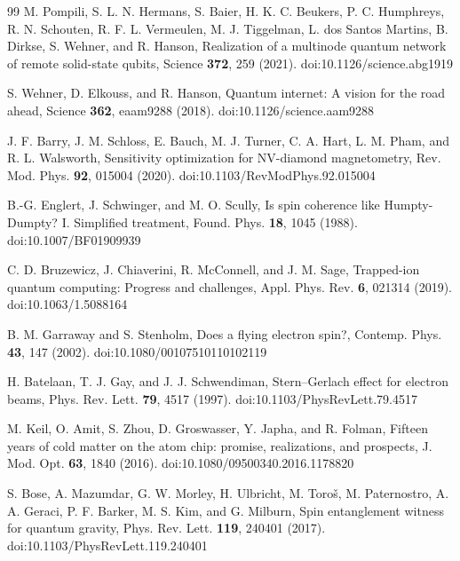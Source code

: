 \documentclass[12pt]{article}
\begin{document}
\begin{thebibliography}{99}
 M. Pompili, S. L. N. Hermans, S. Baier, H. K. C. Beukers, P. C. Humphreys, R. N. Schouten, R. F. L. Vermeulen, M. J. Tiggelman, L. dos Santos Martins, B. Dirkse, S. Wehner, and R. Hanson, Realization of a multinode quantum network of remote solid-state qubits, Science \textbf{372}, 259 (2021). doi:10.1126/science.abg1919

 S. Wehner, D. Elkouss, and R. Hanson, Quantum internet: A vision for the road ahead, Science \textbf{362}, eaam9288 (2018). doi:10.1126/science.aam9288

 J. F. Barry, J. M. Schloss, E. Bauch, M. J. Turner, C. A. Hart, L. M. Pham, and R. L. Walsworth, Sensitivity optimization for NV-diamond magnetometry, Rev. Mod. Phys. \textbf{92}, 015004 (2020). doi:10.1103/RevModPhys.92.015004

 B.-G. Englert, J. Schwinger, and M. O. Scully, Is spin coherence like Humpty-Dumpty? I. Simplified treatment, Found. Phys. \textbf{18}, 1045 (1988). doi:10.1007/BF01909939

 C. D. Bruzewicz, J. Chiaverini, R. McConnell, and J. M. Sage, Trapped-ion quantum computing: Progress and challenges, Appl. Phys. Rev. \textbf{6}, 021314 (2019). doi:10.1063/1.5088164

 B. M. Garraway and S. Stenholm, Does a flying electron spin?, Contemp. Phys. \textbf{43}, 147 (2002). doi:10.1080/00107510110102119

 H. Batelaan, T. J. Gay, and J. J. Schwendiman, Stern--Gerlach effect for electron beams, Phys. Rev. Lett. \textbf{79}, 4517 (1997). doi:10.1103/PhysRevLett.79.4517

 M. Keil, O. Amit, S. Zhou, D. Groswasser, Y. Japha, and R. Folman, Fifteen years of cold matter on the atom chip: promise, realizations, and prospects, J. Mod. Opt. \textbf{63}, 1840 (2016). doi:10.1080/09500340.2016.1178820

 S. Bose, A. Mazumdar, G. W. Morley, H. Ulbricht, M. Toro\v{s}, M. Paternostro, A. A. Geraci, P. F. Barker, M. S. Kim, and G. Milburn, Spin entanglement witness for quantum gravity, Phys. Rev. Lett. \textbf{119}, 240401 (2017). doi:10.1103/PhysRevLett.119.240401
\end{thebibliography}
\end{document}
